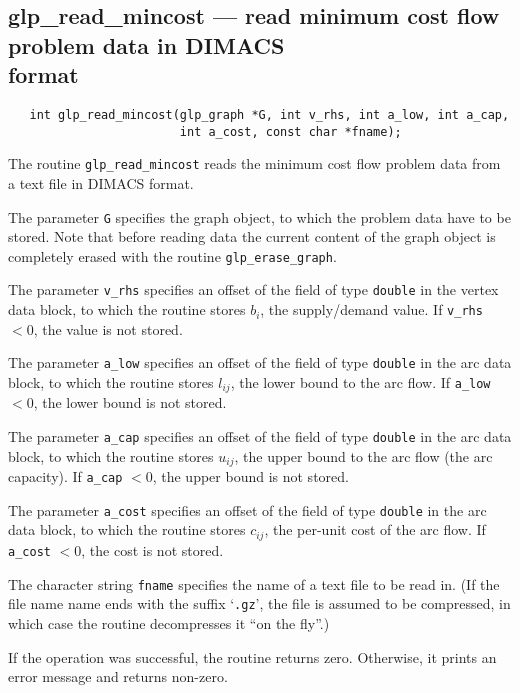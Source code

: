 \documentclass[11pt]{report}
\def\para#1{\noindent{\bf#1}}
\def\synopsis{\para{Synopsis}}
\def\description{\para{Description}}
\def\returns{\para{Returns}}
\begin{document}
\subsection{glp\_read\_mincost --- read minimum cost flow problem data
in DIMACS\\format}

\synopsis

\begin{verbatim}
   int glp_read_mincost(glp_graph *G, int v_rhs, int a_low, int a_cap,
                        int a_cost, const char *fname);
\end{verbatim}

\description

The routine \verb|glp_read_mincost| reads the minimum cost flow problem
data from a text file in DIMACS format.

The parameter \verb|G| specifies the graph object, to which the problem
data have to be stored. Note that before reading data the current
content of the graph object is completely erased with the routine
\verb|glp_erase_graph|.

The parameter \verb|v_rhs| specifies an offset of the field of type
\verb|double| in the vertex data block, to which the routine stores
$b_i$, the supply/demand value. If \verb|v_rhs| $<0$, the value is not
stored.

The parameter \verb|a_low| specifies an offset of the field of type
\verb|double| in the arc data block, to which the routine stores
$l_{ij}$, the lower bound to the arc flow. If \verb|a_low| $<0$, the
lower bound is not stored.

The parameter \verb|a_cap| specifies an offset of the field of type
\verb|double| in the arc data block, to which the routine stores
$u_{ij}$, the upper bound to the arc flow (the arc capacity). If
\verb|a_cap| $<0$, the upper bound is not stored.

The parameter \verb|a_cost| specifies an offset of the field of type
\verb|double| in the arc data block, to which the routine stores
$c_{ij}$, the per-unit cost of the arc flow. If \verb|a_cost| $<0$, the
cost is not stored.

The character string \verb|fname| specifies the name of a text file to
be read in. (If the file name name ends with the suffix `\verb|.gz|',
the file is assumed to be compressed, in which case the routine
decompresses it ``on the fly''.)

\returns

If the operation was successful, the routine returns zero. Otherwise,
it prints an error message and returns non-zero.
\end{document}
